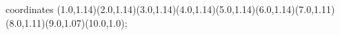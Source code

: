 					coordinates { (1.0,1.14)(2.0,1.14)(3.0,1.14)(4.0,1.14)(5.0,1.14)(6.0,1.14)(7.0,1.11)(8.0,1.11)(9.0,1.07)(10.0,1.0)};